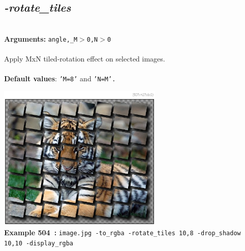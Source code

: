 \documentclass[a4paper,11pt,twoside]{book}
\begin{document}
\subsection{\emph{-rotate\_tiles} }\vspace*{-0.5em}
~\\\textbf{Arguments: } 
{\small \texttt{angle,\_M$>$0,N$>$0}}\\~\\
Apply MxN tiled-rotation effect on selected images.
~\\~\\\textbf{Default values}: {\small \texttt{'M=8'} and \texttt{'N=M'.}}
\begin{center}\includegraphics[keepaspectratio=true,height=7cm,width=\textwidth]{img/gmic_def504.jpg}\\
{\footnotesize \textbf{Example 504~:} \texttt{image.jpg -to\_rgba -rotate\_tiles 10,8 -drop\_shadow 10,10 -display\_rgba}}
\end{center}
\end{document}
